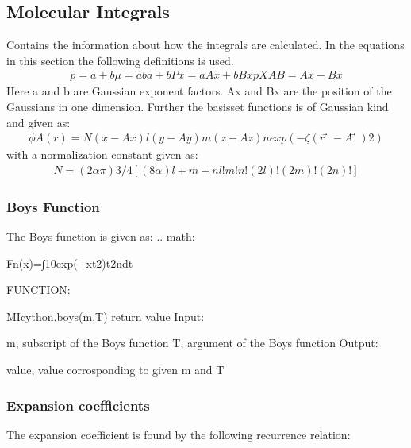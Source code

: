 \documentclass[letterpaper,10pt,english]{sphinxmanual}
\begin{document}
\subsection{Molecular Integrals}
\label{\detokenize{user_molecular_system:molecular-integrals}}
Contains the information about how the integrals are calculated. In the equations in this section the following definitions is used.
\begin{equation*}
\begin{split}p=a+b
μ=aba+b
Px=aAx+bBxp
XAB=Ax−Bx\end{split}
\end{equation*}
Here a and b are Gaussian exponent factors. Ax and Bx are the position of the Gaussians in one dimension. Further the basisset functions is of Gaussian kind and given as:
\begin{equation*}
\begin{split}ϕA(r)=N(x−Ax)l(y−Ay)m(z−Az)nexp(−ζ(r⃗ −A⃗ )2)\end{split}
\end{equation*}
with a normalization constant given as:
\begin{equation*}
\begin{split}N=(2απ)3/4[(8α)l+m+nl!m!n!(2l)!(2m)!(2n)!]\end{split}
\end{equation*}

\subsubsection{Boys Function}
\label{\detokenize{user_molecular_system:boys-function}}
The Boys function is given as:
.. math:

%
\begin{sphinxVerbatim}[commandchars=\\\{\}]
Fn(x)=∫10exp(−xt2)t2ndt
\end{sphinxVerbatim}

FUNCTION:

MIcython.boys(m,T)
return value
Input:

m, subscript of the Boys function
T, argument of the Boys function
Output:

value, value corrosponding to given m and T


\subsubsection{Expansion coefficients}
\label{\detokenize{user_molecular_system:expansion-coefficients}}
The expansion coefficient is found by the following recurrence relation:
\end{document}
